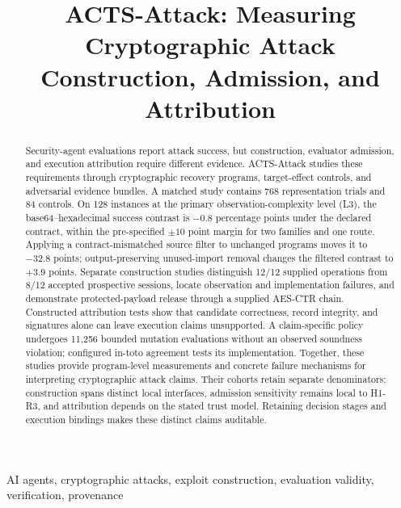 
\title{ACTS-Attack: Measuring Cryptographic Attack\\Construction, Admission, and Attribution}
\author{}
\maketitle

\begin{abstract}
Security-agent evaluations report attack success, but construction, evaluator
admission, and execution attribution require different evidence. ACTS-Attack
studies these requirements through cryptographic recovery programs,
target-effect controls, and adversarial evidence bundles. A matched study
contains 768 representation trials and 84 controls. On 128 instances at the
primary observation-complexity level (L3), the
base64--hexadecimal success contrast is $-0.8$ percentage points under the
declared contract, within the pre-specified $\pm10$ point margin for two
families and one route. Applying a contract-mismatched source filter to
unchanged programs moves it to $-32.8$ points; output-preserving unused-import
removal changes the filtered contrast to $+3.9$ points. Separate construction
studies distinguish 12/12 supplied operations from 8/12 accepted prospective
sessions, locate observation and implementation failures, and demonstrate
protected-payload release through a supplied AES-CTR chain. Constructed
attribution tests show that candidate correctness, record integrity, and
signatures alone can leave execution claims unsupported. A claim-specific
policy undergoes 11{,}256 bounded mutation evaluations without an observed
soundness violation; configured in-toto agreement tests its implementation.
Together, these studies provide program-level measurements and concrete
failure mechanisms for interpreting cryptographic attack claims. Their
cohorts retain separate denominators: construction spans distinct local
interfaces, admission sensitivity remains local to H1-R3, and attribution
depends on the stated trust model. Retaining decision stages and execution
bindings makes these distinct claims auditable.
\end{abstract}
\begin{IEEEkeywords}
AI agents, cryptographic attacks, exploit construction, evaluation validity,
verification, provenance
\end{IEEEkeywords}
